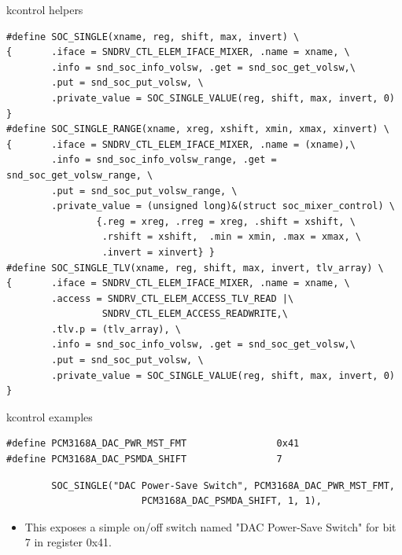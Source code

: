 \begin{frame}[fragile]{kcontrol helpers}
  \begin{block}{}
    \fontsize{9}{9}\selectfont
    \begin{verbatim}
#define SOC_SINGLE(xname, reg, shift, max, invert) \
{       .iface = SNDRV_CTL_ELEM_IFACE_MIXER, .name = xname, \
        .info = snd_soc_info_volsw, .get = snd_soc_get_volsw,\
        .put = snd_soc_put_volsw, \
        .private_value = SOC_SINGLE_VALUE(reg, shift, max, invert, 0) }
#define SOC_SINGLE_RANGE(xname, xreg, xshift, xmin, xmax, xinvert) \
{       .iface = SNDRV_CTL_ELEM_IFACE_MIXER, .name = (xname),\
        .info = snd_soc_info_volsw_range, .get = snd_soc_get_volsw_range, \
        .put = snd_soc_put_volsw_range, \
        .private_value = (unsigned long)&(struct soc_mixer_control) \
                {.reg = xreg, .rreg = xreg, .shift = xshift, \
                 .rshift = xshift,  .min = xmin, .max = xmax, \
                 .invert = xinvert} }
#define SOC_SINGLE_TLV(xname, reg, shift, max, invert, tlv_array) \
{       .iface = SNDRV_CTL_ELEM_IFACE_MIXER, .name = xname, \
        .access = SNDRV_CTL_ELEM_ACCESS_TLV_READ |\
                 SNDRV_CTL_ELEM_ACCESS_READWRITE,\
        .tlv.p = (tlv_array), \
        .info = snd_soc_info_volsw, .get = snd_soc_get_volsw,\
        .put = snd_soc_put_volsw, \
        .private_value = SOC_SINGLE_VALUE(reg, shift, max, invert, 0) }
    \end{verbatim}
  \end{block}
\end{frame}

\begin{frame}[fragile]{kcontrol examples}
  \begin{block}{}
    \fontsize{9}{9}\selectfont
    \begin{verbatim}
#define PCM3168A_DAC_PWR_MST_FMT                0x41
#define PCM3168A_DAC_PSMDA_SHIFT                7
    \end{verbatim}
  \end{block}
  \begin{block}{\kfile{sound/soc/codecs/pcm3168a.c}}
    \fontsize{9}{9}\selectfont
    \begin{verbatim}
        SOC_SINGLE("DAC Power-Save Switch", PCM3168A_DAC_PWR_MST_FMT,
                        PCM3168A_DAC_PSMDA_SHIFT, 1, 1),
    \end{verbatim}
  \end{block}
  \begin{itemize}
  \item This exposes a simple on/off switch named "DAC Power-Save
    Switch" for bit 7 in register 0x41.
  \end{itemize}
\end{frame}

